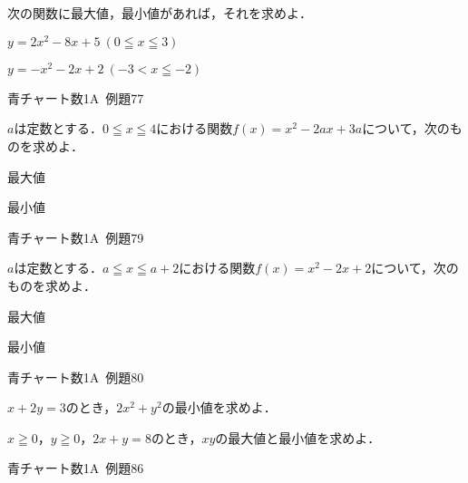 \documentclass[b4paper, dvipdfmx, 11pt, fleqn, twocolumn, uplatex]{jsarticle}
\newenvironment{tabbedenum}[1]
{\NumTabs{#1}\begin{enumerate*}[label={(\arabic*)},itemjoin={\tab}]}{\end{enumerate*}}
\begin{document}

\begin{screen}
次の関数に最大値，最小値があれば，それを求めよ．\\
\begin{tabbedenum}{2}
	\item $y=2x^2-8x+5~(0\leqq x\leqq3)$
	\item $y=-x^2-2x+2~(-3<x\leqq-2)$
\end{tabbedenum}
\begin{flushright}
    青チャート数1A~例題77
\end{flushright}
\end{screen}


\begin{screen}
$a$は定数とする．$0\leqq x\leqq4$における関数$f(x)=x^2-2ax+3a$について，次のものを求めよ．\\
\begin{tabbedenum}{2}
	\item 最大値
	\item 最小値
\end{tabbedenum}
\begin{flushright}
    青チャート数1A~例題79
\end{flushright}
\end{screen}


\begin{screen}
$a$は定数とする．$a\leqq x\leqq a+2$における関数$f(x)=x^2-2x+2$について，次のものを求めよ．\\
\begin{tabbedenum}{2}
	\item 最大値
	\item 最小値
\end{tabbedenum}
\begin{flushright}
    青チャート数1A~例題80
\end{flushright}
\end{screen}


\begin{screen}
\begin{tabbedenum}{2}
	\item $x+2y=3$のとき，$2x^2+y^2$の最小値を求めよ．
	\item $x\geqq0$，$y\geqq0$，$2x+y=8$のとき，$xy$の最大値と最小値を求めよ．
\end{tabbedenum}
\begin{flushright}
    青チャート数1A~例題86
\end{flushright}
\end{screen}
\end{document}
